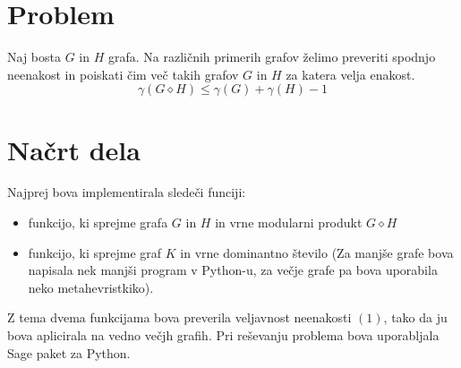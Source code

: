 \documentclass[a4paper,12pt]{article}
\begin{document}
\section{Problem}
Naj bosta $G$ in $H$ grafa.
Na različnih primerih grafov želimo preveriti 
spodnjo neenakost in poiskati čim več takih grafov $G$ in $H$ za katera velja enakost.
\begin{equation}
    \gamma(G\diamond H) \leq \gamma (G) + \gamma (H) - 1
\end{equation}
    
\section{Načrt dela}
Najprej bova implementirala sledeči funciji:
    \begin{itemize}
        \item funkcijo, ki sprejme grafa $G$ in $H$ in vrne modularni produkt $G \diamond H$
        \item funkcijo, ki sprejme graf $K$ in vrne dominantno število (Za manjše grafe bova napisala nek manjši program v Python-u,
        za večje grafe pa bova uporabila neko metahevristkiko).
    \end{itemize}
Z tema dvema funkcijama bova preverila veljavnost neenakosti $(1)$, tako da ju bova aplicirala na vedno večjh grafih.
Pri reševanju problema bova uporabljala Sage paket za Python.
\end{document}
